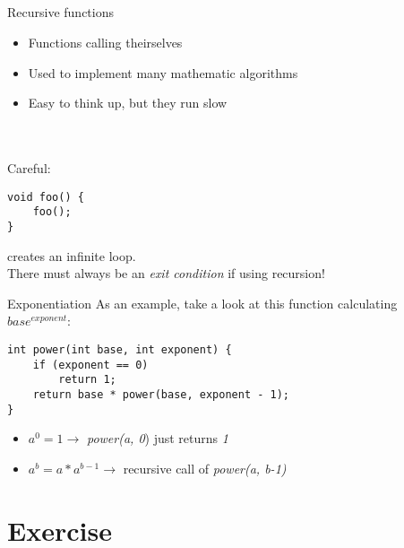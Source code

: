 \subsection{}
\begin{frame}[fragile]{Recursive functions}
	\begin{itemize}
		\item Functions calling theirselves
		\item Used to implement many mathematic algorithms
		\item Easy to think up, but they run slow
	\end{itemize} \ \\ \ \\
	Careful:
	\begin{lstlisting}
void foo() {
	foo();
}
\end{lstlisting}
	creates an infinite loop. \\
	There must always be an \textit{exit condition} if using recursion!
\end{frame}
\begin{frame}[fragile]{Exponentiation}
As an example, take a look at this function calculating $base^{exponent}$:
	\begin{lstlisting}
int power(int base, int exponent) {
	if (exponent == 0)
		return 1;
	return base * power(base, exponent - 1);
}
\end{lstlisting}
	\begin{itemize}
		\item $a^{0} = 1 \rightarrow$ \textit{power(a, 0}) just returns \textit{1}
		\item $a^{b} = a * a^{b-1} \rightarrow$ recursive call of \textit{power(a, b-1)}
	\end{itemize}
\end{frame}
\section{Exercise}
